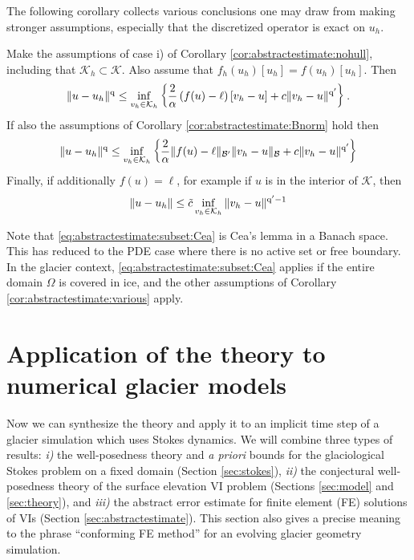 \documentclass[hidelinks,onefignum,onetabnum,final]{siamart220329}  %
\newcommand{\cB}{\mathcal{B}}
\newcommand{\cK}{\mathcal{K}}
\newcommand{\qq}{{\text{\textnormal{q}}}}
\begin{document}
The following corollary collects various conclusions one may draw from making stronger assumptions, especially that the discretized operator is exact on $u_h$.

\begin{corollary}  \label{cor:abstractestimate:various}  Make the assumptions of case i) of Corollary \ref{cor:abstractestimate:nohull}, including that $\cK_h \subset \cK$.  Also assume that $f_h(u_h)[u_h] = f(u_h)[u_h]$.  Then
\begin{equation}
\|u-u_h\|^\qq \le  \inf_{v_h\in\cK_h} \left\{\frac{2}{\alpha} \left(f(u)-\ell\right)[v_h-u] + c \|v_h - u\|^{\qq'}\right\}. \label{eq:abstractestimate:subset}
\end{equation}
If also the assumptions of Corollary \ref{cor:abstractestimate:Bnorm} hold then
\begin{equation}
\|u-u_h\|^\qq \le \inf_{v_h\in\cK_h} \left\{\frac{2}{\alpha} \|f(u)-\ell\|_{\cB'} \|v_h-u\|_{\cB} + c \|v_h-u\|^{\qq'}\right\} \label{eq:abstractestimate:subset:Bnorm}
\end{equation}
Finally, if additionally $f(u)=\ell$, for example if $u$ is in the interior of $\cK$, then
\begin{equation}
\|u-u_h\| \le \tilde c \inf_{v_h\in\cK_h} \|v_h-u\|^{\qq'-1} \label{eq:abstractestimate:subset:Cea}
\end{equation}
\end{corollary}

Note that \eqref{eq:abstractestimate:subset:Cea} is Cea's lemma \cite[Theorem 2.4.1]{Ciarlet2002} in a Banach space.  This has reduced to the PDE case where there is no active set or free boundary.  In the glacier context, \eqref{eq:abstractestimate:subset:Cea} applies if the entire domain $\Omega$ is covered in ice, and the other assumptions of Corollary \ref{cor:abstractestimate:various} apply.


\section{Application of the theory to numerical glacier models} \label{sec:application}

Now we can synthesize the theory and apply it to an implicit time step of a glacier simulation which uses Stokes dynamics.  We will combine three types of results: \emph{i)} the well-posedness theory and \emph{a priori} bounds for the glaciological Stokes problem on a fixed domain (Section \ref{sec:stokes}), \emph{ii)} the conjectural well-posedness theory of the surface elevation VI problem (Sections \ref{sec:model} and \ref{sec:theory}), and \emph{iii)} the abstract error estimate for finite element (FE) solutions of VIs (Section \ref{sec:abstractestimate}).  This section also gives a precise meaning to the phrase ``conforming FE method'' for an evolving glacier geometry simulation.
\end{document}
